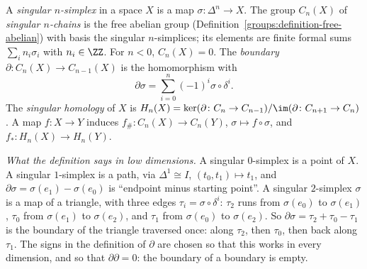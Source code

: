 \begin{definition}\label{singular-homology:definition-singular-homology}
A \emph{singular $n$-simplex} in a space $X$ is a map $\sigma \colon \Delta^n \to X$. The group $C_n(X)$ of \emph{singular $n$-chains} is the free abelian group
(Definition~\ref{groups:definition-free-abelian}) with basis the singular $n$-simplices; its elements are finite formal sums $\sum_i n_i\sigma_i$ with
$n_i \in \ZZ$. For $n < 0$, $C_n(X) = 0$. The \emph{boundary} $\partial \colon C_n(X) \to C_{n-1}(X)$ is the homomorphism with
\[
\partial\sigma = \sum_{i=0}^n (-1)^i \sigma \circ \delta^i.
\]
The \emph{singular homology} of $X$ is $H_n(X) = \ker(\partial \colon C_n \to C_{n-1})/\im(\partial \colon C_{n+1} \to C_n)$. A map $f \colon X \to Y$ induces
$f_\# \colon C_n(X) \to C_n(Y)$, $\sigma \mapsto f \circ \sigma$, and $f_* \colon H_n(X) \to H_n(Y)$.
\end{definition}

\emph{What the definition says in low dimensions.} A singular $0$-simplex is a point of $X$. A singular $1$-simplex is a path, via $\Delta^1 \cong I$, $(t_0, t_1) \mapsto t_1$,
and $\partial\sigma = \sigma(e_1) - \sigma(e_0)$ is ``endpoint minus starting point''. A singular $2$-simplex $\sigma$ is a map of a triangle, with three edges
$\tau_i = \sigma \circ \delta^i$: $\tau_2$ runs from $\sigma(e_0)$ to $\sigma(e_1)$, $\tau_0$ from $\sigma(e_1)$ to $\sigma(e_2)$, and $\tau_1$ from $\sigma(e_0)$ to $\sigma(e_2)$.
So $\partial\sigma = \tau_2 + \tau_0 - \tau_1$ is the boundary of the triangle traversed once: along $\tau_2$, then $\tau_0$, then back along $\tau_1$. The signs in the
definition of $\partial$ are chosen so that this works in every dimension, and so that $\partial\partial = 0$: the boundary of a boundary is empty.

